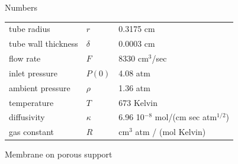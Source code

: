 \documentclass[12pt,a4paper,CJK]{beamer}
\begin{document}
\begin{CJK*}{UTF8}{gkai}
\begin{frame}{Numbers}
\renewcommand{\arraystretch}{1.7}
\begin{tabular}{lll}
  tube radius & $r$ & 0.3175 cm \\
  tube wall thickness & $\delta$ & 0.0003 cm \\
  flow rate & $F$ & 8330 cm$^3$/sec \\
  inlet pressure & $P(0)$ & 4.08 atm \\
  ambient pressure & $\rho$ & 1.36 atm \\
  temperature & $T$ & 673 Kelvin \\
  diffusivity & $\kappa$ & 6.96 10$^{-8}$ mol/(cm sec atm$^{1/2}$) \\
  gas constant & $R$ & cm$^3$ atm / (mol Kelvin)
\end{tabular}

\end{frame}

\begin{frame}{Membrane on porous support}




\end{frame}
\end{CJK*}
\end{document}
